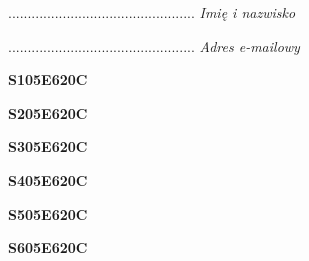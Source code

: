 \begin{turn}{90}\begin{minipage}{\linewidth} \vspace{20mm} ................................................  \textit{Imię i nazwisko}\end{minipage}\end{turn}

\begin{turn}{90}\begin{minipage}{\linewidth} \vspace{20mm} ................................................  \textit{Adres e-mailowy}\end{minipage}\end{turn}

\begin{turn}{90}\huge \begin{minipage}{\linewidth} \vspace{10mm}\textbf{S105E620C}\end{minipage}\end{turn}

\begin{turn}{90}\huge \begin{minipage}{\linewidth} \vspace{10mm}\textbf{S205E620C}\end{minipage}\end{turn}

\begin{turn}{90}\huge \begin{minipage}{\linewidth} \vspace{10mm}\textbf{S305E620C}\end{minipage}\end{turn}

\begin{turn}{90}\huge \begin{minipage}{\linewidth} \vspace{10mm}\textbf{S405E620C}\end{minipage}\end{turn}

\begin{turn}{90}\huge \begin{minipage}{\linewidth} \vspace{10mm}\textbf{S505E620C}\end{minipage}\end{turn}

\begin{turn}{90}\huge \begin{minipage}{\linewidth} \vspace{10mm}\textbf{S605E620C}\end{minipage}\end{turn}

